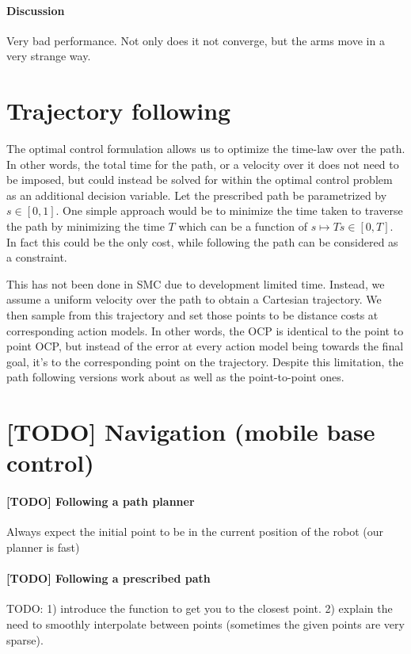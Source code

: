 \paragraph{Discussion}
Very bad performance. Not only does it not converge, but the arms move in 
a very strange way.

\section{Trajectory following}
The optimal control formulation allows us to optimize the time-law
over the path. In other words, the total time for the path,
or a velocity over it does not need to be imposed, but could instead
be solved for within the optimal control problem as an additional decision variable.
Let the prescribed path be parametrized by 
$ s \in [0,1]  $. One simple approach would be to minimize
the time taken to traverse the path by minimizing the time $ T  $ which
can be a function of $ s \mapsto Ts \in [0,T]  $.
In fact this could be the only cost, while following the path can 
be considered as a constraint.

This has not been done in SMC due to development limited time.
Instead, we assume a uniform velocity over the path
to obtain a Cartesian trajectory. We then sample from this trajectory
and set those points to be distance costs at corresponding action models.
In other words, the OCP is identical to the point to point OCP, 
but instead of the error at every action model being towards the final goal,
it's to the corresponding point on the trajectory.
Despite this limitation, the path following versions
work about as well as the point-to-point ones.



\section{[TODO] Navigation (mobile base control)}
\paragraph{[TODO] Following a path planner} 
 Always expect the initial point to be in the current position of the robot
(our planner is fast)

\paragraph{[TODO] Following a prescribed path}
TODO: 1) introduce the function to get you to the closest point. 
2) explain the need to smoothly interpolate between points
(sometimes the given points are very sparse).
